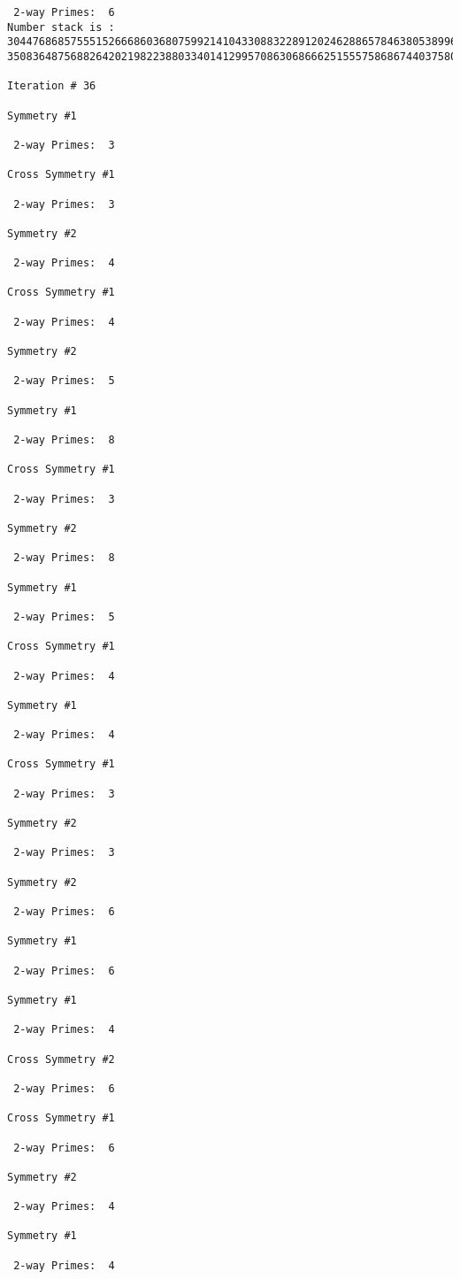 \begin{verbatim}
 2-way Primes: 	6
Number stack is :
30447686857555152666860368075992141043308832289120246288657846380538996794608835958544046240163340857
35083648756882642021982238803340141299570863068666251555758686744037580433610426404458595388064976998

Iteration #	36

Symmetry #1

 2-way Primes: 	3

Cross Symmetry #1

 2-way Primes: 	3

Symmetry #2

 2-way Primes: 	4

Cross Symmetry #1

 2-way Primes: 	4

Symmetry #2

 2-way Primes: 	5

Symmetry #1

 2-way Primes: 	8

Cross Symmetry #1

 2-way Primes: 	3

Symmetry #2

 2-way Primes: 	8

Symmetry #1

 2-way Primes: 	5

Cross Symmetry #1

 2-way Primes: 	4

Symmetry #1

 2-way Primes: 	4

Cross Symmetry #1

 2-way Primes: 	3

Symmetry #2

 2-way Primes: 	3

Symmetry #2

 2-way Primes: 	6

Symmetry #1

 2-way Primes: 	6

Symmetry #1

 2-way Primes: 	4

Cross Symmetry #2

 2-way Primes: 	6

Cross Symmetry #1

 2-way Primes: 	6

Symmetry #2

 2-way Primes: 	4

Symmetry #1

 2-way Primes: 	4


\end{verbatim}
